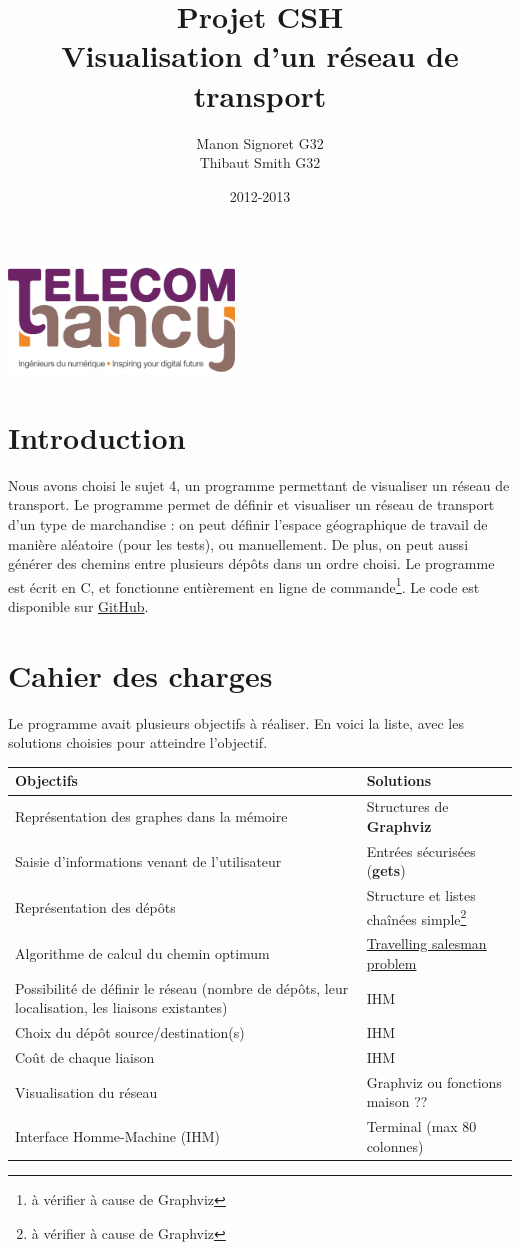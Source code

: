 \documentclass[12pt,a4paper]{report}
\date{2012-2013}
\author{Manon Signoret G32\\Thibaut Smith G32}
\title{Projet CSH\\Visualisation d'un r\'{e}seau de transport}
\makeatletter
\def\maketitle{
  \null
  \begin{flushleft}
   \includegraphics[width=6cm]{telecom_nancy.png}
  \end{flushleft}
  \vfill
  \begin{center}\leavevmode
    \normalfont
    {\LARGE \@title\par}
    {\Large \@date\par} 
    \vskip 1cm
    
  \end{center}
  \vfill
  \hfill
  \begin{flushright}
    {\Large \@author\par}
  \end{flushright}
  \cleardoublepage
  }
\makeatother
\begin{document}
\thispagestyle{empty}
\maketitle
\pagebreak

\section{Introduction}
Nous avons choisi le sujet 4, un programme permettant de visualiser un r\'{e}seau de transport. Le programme permet de d\'{e}finir et visualiser un r\'{e}seau de transport d'un type de marchandise : on peut d\'{e}finir l'espace g\'{e}ographique de travail de mani\`{e}re al\'{e}atoire (pour les tests), ou manuellement. De plus, on peut aussi g\'{e}n\'{e}rer des chemins entre plusieurs d\'{e}pôts dans un ordre choisi. Le programme est \'{e}crit en C, et fonctionne enti\`{e}rement en ligne de commande\footnote{\`{a} v\'{e}rifier \`{a} cause de Graphviz}. Le code est disponible sur \href{https://github.com/Videl/Graph-Visualization-Manager}{GitHub}.


\section{Cahier des charges}
Le programme avait plusieurs objectifs \`{a} r\'{e}aliser. En voici la liste, avec les solutions choisies pour atteindre l'objectif.

\begin{center}
  \begin{tabular}{|m{7cm}|m{7cm}|}
    \hline
    \textbf{Objectifs} & \textbf{Solutions} \\
    \hline
    Repr\'{e}sentation des graphes dans la m\'{e}moire       & Structures de \textbf{Graphviz} \\
    \hline
    Saisie d'informations venant de l'utilisateur    & Entr\'{e}es s\'{e}curis\'{e}es (\textbf{gets}) \\
    \hline
    Repr\'{e}sentation des d\'{e}pôts                        & Structure et listes chaîn\'{e}es simple\footnote{\`{a} v\'{e}rifier \`{a} cause de Graphviz} \\
    \hline
    Algorithme de calcul du chemin optimum           & \href{https://en.wikipedia.org/wiki/Travelling_salesman_problem}{Travelling salesman problem} \\
    \hline
    Possibilit\'{e} de d\'{e}finir le r\'{e}seau (nombre de d\'{e}p\^ots, leur localisation, les liaisons existantes)			     &	IHM \\
    \hline
    Choix du d\'{e}p\^ot source/destination(s)			 & IHM \\
    \hline
    Co\^ut de chaque liaison						 & IHM \\
    \hline
  	Visualisation du r\'{e}seau							 & Graphviz ou fonctions maison ?? \\
    \hline
    Interface Homme-Machine (IHM)                    & Terminal (max 80 colonnes) \\
    \hline
    
  \end{tabular}
\end{center}
\end{document}
